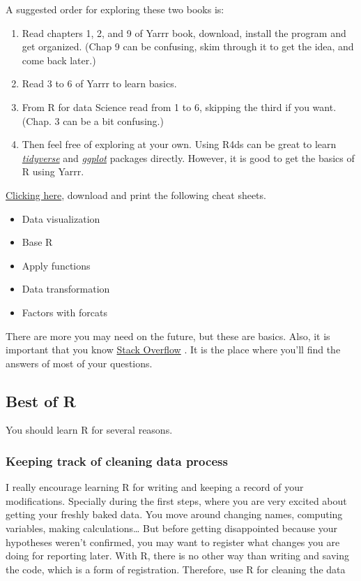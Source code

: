 \documentclass{article}
\begin{document}
\begin{flushleft}
A suggested order for exploring these two books is:
\end{flushleft}

\begin{enumerate}
    \item Read chapters 1, 2, and 9 of Yarrr book, download, install the program and get organized. (Chap 9 can be confusing, skim through it to get the idea, and come back later.)
    \item Read 3 to 6 of Yarrr to learn basics. 
    \item From R for data Science read from 1 to 6, skipping the third if you want. (Chap. 3 can be a bit confusing.)  
    \item Then feel free of exploring at your own. Using R4ds can be great to learn \href{https://www.tidyverse.org/} {\emph{tidyverse}}\citep{wickham2017tidyverse} and \href{https://ggplot2.tidyverse.org/}{\emph{ggplot}} \citep{wickham2007ggplot} packages directly. However, it is good to get the basics of R using Yarrr.
\end{enumerate}

\begin{flushleft}
\href{https://rstudio.com/resources/cheatsheets/}{Clicking here}, download and print the following cheat sheets. 
\end{flushleft}

\begin{itemize}
    \item Data visualization
    \item Base R
    \item Apply functions
    \item Data transformation
    \item Factors with forcats
\end{itemize}
There are more you may need on the future, but these are basics.
Also, it is important that you know \href{https://stackoverflow.com/}{Stack Overflow} . It is the place where you'll find the answers of most of your questions. 



\subsection{Best of R}
\label{subsec: Best R}
You should learn R for several reasons. 
\subsubsection{Keeping track of cleaning data process}
\label{subsec: track cleaning}
I really encourage learning R for writing and keeping a record of your modifications. Specially during the first steps, where you are very excited about getting your freshly baked data. You move around changing names, computing variables, making calculations… But before getting disappointed because your hypotheses weren’t confirmed, you may want to register what changes you are doing for reporting later. With R, there is no other way than writing and saving the code, which is a form of registration. Therefore, use R for cleaning the data
\end{document}
